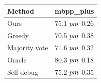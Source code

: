 \begin{tabular}{lc}
\toprule
Method & mbpp_plus \\
\midrule
Ours & 75.1 $\\pm$ 0.26 \\
Greedy & 70.5 $\\pm$ 0.38 \\
Majority vote & 71.6 $\\pm$ 0.32 \\
Oracle & 80.3 $\\pm$ 0.18 \\
Self-debug & 75.2 $\\pm$ 0.35 \\
\bottomrule
\end{tabular}
